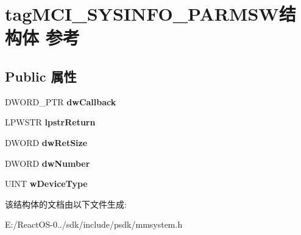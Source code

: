 \hypertarget{structtag_m_c_i___s_y_s_i_n_f_o___p_a_r_m_s_w}{}\section{tag\+M\+C\+I\+\_\+\+S\+Y\+S\+I\+N\+F\+O\+\_\+\+P\+A\+R\+M\+S\+W结构体 参考}
\label{structtag_m_c_i___s_y_s_i_n_f_o___p_a_r_m_s_w}
\subsection*{Public 属性}
\begin{DoxyCompactItemize}
\item 
\mbox{\label{structtag_m_c_i___s_y_s_i_n_f_o___p_a_r_m_s_w_aa235c540a4ef655d1bac67d683feded7}} 
D\+W\+O\+R\+D\+\_\+\+P\+TR {\bfseries dw\+Callback}
\item 
\mbox{\label{structtag_m_c_i___s_y_s_i_n_f_o___p_a_r_m_s_w_af0268f3c5869fd1329968b36e87e6634}} 
L\+P\+W\+S\+TR {\bfseries lpstr\+Return}
\item 
\mbox{\label{structtag_m_c_i___s_y_s_i_n_f_o___p_a_r_m_s_w_a81e82f4597262ae1adf8d9900ae42f75}} 
D\+W\+O\+RD {\bfseries dw\+Ret\+Size}
\item 
\mbox{\label{structtag_m_c_i___s_y_s_i_n_f_o___p_a_r_m_s_w_a348b974a4890e995c67742755f4bc2c6}} 
D\+W\+O\+RD {\bfseries dw\+Number}
\item 
\mbox{\label{structtag_m_c_i___s_y_s_i_n_f_o___p_a_r_m_s_w_a2837e1632ac558cf8ec8b0a01c812f79}} 
U\+I\+NT {\bfseries w\+Device\+Type}
\end{DoxyCompactItemize}


该结构体的文档由以下文件生成\+:\begin{DoxyCompactItemize}
\item 
E\+:/\+React\+O\+S-\/0../sdk/include/psdk/mmsystem.\+h\end{DoxyCompactItemize}
